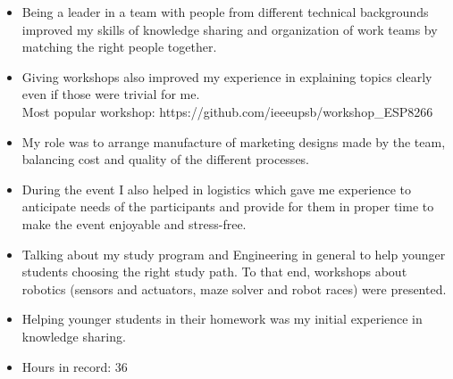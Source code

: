 \documentclass[10pt,a4paper,ragged2e]{altacv}
\begin{document}
\divider

\begin{itemize}
	\item Being a leader in a team with people from different technical backgrounds improved my skills of knowledge sharing and organization of work teams by matching the right people together.
	\item Giving workshops also improved my experience in explaining topics clearly even if those were trivial for me.\\
	Most popular workshop: https://github.com/ieeeupsb/workshop\_ESP8266
\end{itemize}

\divider

\begin{itemize}
	\item My role was to arrange manufacture of marketing designs made by the team, balancing cost and quality of the different processes.
	\item During the event I also helped in logistics which gave me experience to anticipate needs of the participants and provide for them in proper time to make the event enjoyable and stress-free.
\end{itemize}

\divider

\begin{itemize}
	\item Talking about my study program and Engineering in general to help younger students choosing the right study path. To that end, workshops about robotics (sensors and actuators, maze solver and robot races) were presented.
\end{itemize}

\divider

\begin{itemize}
	\item Helping younger students in their homework was my initial experience in knowledge sharing.
	\item Hours in record: 36
\end{itemize}
\end{document}
